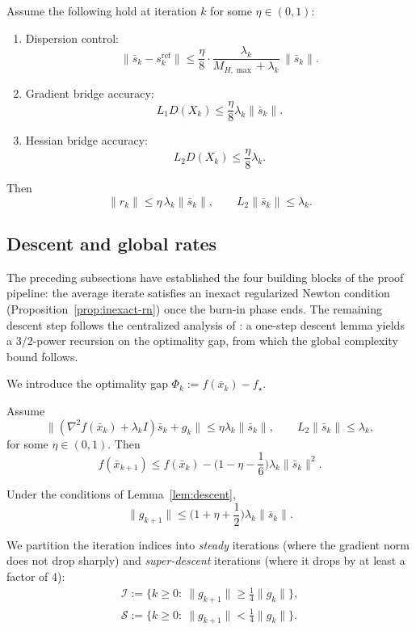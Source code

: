 \documentclass[review,onefignum,onetabnum]{siamart171218}
\begin{document}
\begin{proposition}\label{prop:inexact-rn}
Assume the following hold at iteration $k$ for some $\eta\in(0,1)$:
\begin{enumerate}[leftmargin=1.2em,itemsep=2pt]
\item Dispersion control:
\[
\|\bar s_k-s_k^{\mathrm{ref}}\|\le \frac{\eta}{8}\cdot \frac{\lambda_k}{M_{H,\max}+\lambda_k}\,\|\bar s_k\|.
\]
\item Gradient bridge accuracy:
\[
L_1D(X_k)\le \frac{\eta}{8}\lambda_k\|\bar s_k\|.
\]
\item Hessian bridge accuracy:
\[
L_2D(X_k)\le \frac{\eta}{8}\lambda_k.
\]
\end{enumerate}
Then
\[
\|r_k\|\le \eta\,\lambda_k\|\bar s_k\|,
\qquad
L_2\|\bar s_k\|\le \lambda_k.
\]
\end{proposition}

\subsection{Descent and global rates}\label{ssec:descent}
The preceding subsections have established the four building blocks
of the proof pipeline: the average
iterate satisfies an inexact regularized Newton condition
(Proposition~\ref{prop:inexact-rn}) once the burn-in phase ends.
The remaining descent step follows the centralized analysis of
\citet{mishchenko2023rn}: a one-step descent lemma yields a
$3/2$-power recursion on the optimality gap, from which the global
complexity bound follows.

We introduce the optimality gap $\Phi_k:=f(\bar x_k)-f_\star$.

\begin{lemma}\label{lem:descent}
Assume
\[
\|(\nabla^2 f(\bar x_k)+\lambda_k I)\bar s_k+g_k\|\le \eta\lambda_k\|\bar s_k\|,
\qquad
L_2\|\bar s_k\|\le \lambda_k,
\]
for some $\eta\in(0,1)$.
Then
\[
f(\bar x_{k+1})\le f(\bar x_k) - \Big(1-\eta-\frac{1}{6}\Big)\lambda_k\|\bar s_k\|^2.
\]
\end{lemma}

\begin{lemma}\label{lem:grad_bound}
Under the conditions of Lemma~\ref{lem:descent},
\[
\|g_{k+1}\|\le \Big(1+\eta+\frac{1}{2}\Big)\lambda_k\|\bar s_k\|.
\]
\end{lemma}

We partition the iteration indices into \emph{steady} iterations
(where the gradient norm does not drop sharply) and
\emph{super-descent} iterations (where it drops by at least a factor of 4):
\begin{gather*}
\mathcal I:=\{k\ge0:\ \|g_{k+1}\|\ge \tfrac14\|g_k\|\},\\
\mathcal S:=\{k\ge0:\ \|g_{k+1}\|< \tfrac14\|g_k\|\}.
\end{gather*}
\end{document}
